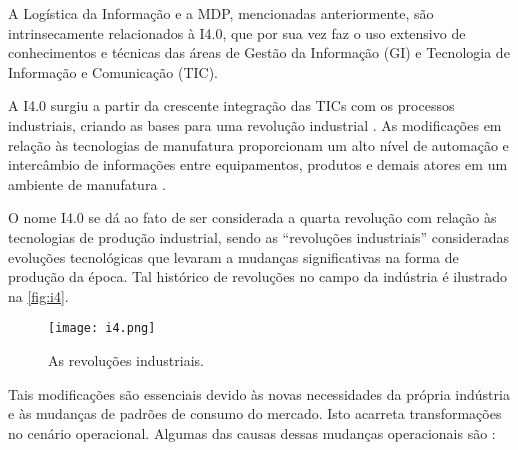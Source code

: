 A Logística da Informação e a MDP, mencionadas anteriormente, são intrinsecamente relacionados à I4.0, que por sua vez faz o uso extensivo de conhecimentos e técnicas das áreas de Gestão da Informação (GI) e Tecnologia de Informação e Comunicação (TIC).

A I4.0 surgiu a partir da crescente integração das TICs com os processos industriais, criando as bases para uma revolução industrial \cite{hermann2016design}. As modificações em relação às tecnologias de manufatura proporcionam um alto nível de automação e intercâmbio de informações entre equipamentos, produtos e demais atores em um ambiente de manufatura \cite{lasi2014industryfour}.

O nome I4.0 se dá ao fato de ser considerada a quarta revolução com relação às tecnologias de produção industrial, sendo as ``revoluções industriais'' consideradas evoluções tecnológicas que levaram a mudanças significativas na forma de produção da época. Tal histórico de revoluções no campo da indústria é ilustrado na \autoref{fig:i4}.

\begin{figure}[htb]
	\centering
	\texttt{[image: i4.png]}
	\caption{As revoluções industriais.}
	\label{fig:i4}
\end{figure}

Tais modificações são essenciais devido às novas necessidades da própria indústria e às mudanças de padrões de consumo do mercado. Isto acarreta transformações no cenário operacional. Algumas das causas dessas mudanças operacionais são \cite{lasi2014industryfour}:

